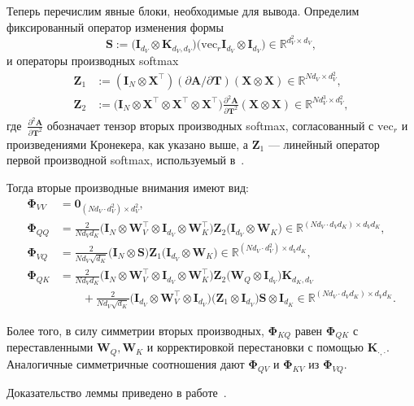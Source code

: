 \begin{lemma}
Теперь перечислим явные блоки, необходимые для вывода. Определим фиксированный оператор изменения формы
\[
    \mathbf{S} := \big(\mathbf{I}_{d_V} \otimes \mathbf{K}_{d_V, d_V}\big) \big(\mathrm{vec}_r \mathbf{I}_{d_V} \otimes \mathbf{I}_{d_V}\big)
    \in \mathbb{R}^{d_V^2 \times d_V},
\]
и операторы производных softmax
\begin{align}
    \mathbf{Z}_1 &:= (\mathbf{I}_{N} \otimes \mathbf{X}^\top)(\partial\mathbf{A}/\partial\mathbf{T})(\mathbf{X} \otimes \mathbf{X}) \in \mathbb{R}^{N d_V \times d_V^2}, \\
    \mathbf{Z}_2 &:= \big(\mathbf{I}_{N} \otimes \mathbf{X}^\top \otimes \mathbf{X}^\top \otimes \mathbf{X}^\top\big)
    \frac{\partial^2 \mathbf{A}}{\partial \mathbf{T}^2}
    (\mathbf{X} \otimes \mathbf{X})
    \in \mathbb{R}^{N d_V^3 \times d_V^2},
\end{align}
где~$\tfrac{\partial^2 \mathbf{A}}{\partial \mathbf{T}^2}$ обозначает тензор вторых производных softmax, согласованный с $\mathrm{vec}_r$ и произведениями Кронекера, как указано выше, а $\mathbf{Z}_1$ — линейный оператор первой производной softmax, используемый в~\cite{ormaniec2024attentionhessian}.

Тогда вторые производные внимания имеют вид:
\begin{align}
    \boldsymbol{\Phi}_{VV} &= \mathbf{0}_{(N d_V \cdot d_V^2) \times d_V^2}, \\
    \boldsymbol{\Phi}_{QQ} &= \frac{2}{N d_V d_K}
    \big(\mathbf{I}_{N} \otimes \mathbf{W}_V^\top \otimes \mathbf{I}_{d_V} \otimes \mathbf{W}_K^\top\big)
    \mathbf{Z}_2
    \big(\mathbf{I}_{d_V} \otimes \mathbf{W}_K\big)
    \in \mathbb{R}^{(N d_V \cdot d_V d_K) \times d_V d_K}, \\
    \boldsymbol{\Phi}_{VQ} &= \frac{2}{N d_V \sqrt{d_K}}
    \big(\mathbf{I}_{N} \otimes \mathbf{S}\big)
    \mathbf{Z}_1
    \big(\mathbf{I}_{d_V} \otimes \mathbf{W}_K\big)
    \in \mathbb{R}^{(N d_V \cdot d_V^2) \times d_V d_K}, \\
    \boldsymbol{\Phi}_{QK}
    &= \frac{2}{N d_V d_K}
    \big(\mathbf{I}_{N} \otimes \mathbf{W}_V^\top \otimes \mathbf{I}_{d_V} \otimes \mathbf{W}_K^\top\big)
    \mathbf{Z}_2
    \big(\mathbf{W}_Q \otimes \mathbf{I}_{d_V}\big) \mathbf{K}_{d_K, d_V} \\
    &\qquad + \frac{2}{N d_V \sqrt{d_K}}
    \big(\mathbf{I}_{d_V} \otimes \mathbf{W}_V^\top \otimes \mathbf{I}_{d_V}\big)
    \big(\mathbf{Z}_1 \otimes \mathbf{I}_{d_V}\big) \mathbf{S} \otimes \mathbf{I}_{d_K} \in \mathbb{R}^{(N d_V \cdot d_V d_K) \times d_V d_K}.
\end{align}

Более того, в силу симметрии вторых производных, $\boldsymbol{\Phi}_{KQ}$ равен $\boldsymbol{\Phi}_{QK}$ с переставленными $\mathbf{W}_Q,\mathbf{W}_K$ и корректировкой перестановки с помощью $\mathbf{K}_{\cdot,\cdot}$.
Аналогичные симметричные соотношения дают $\boldsymbol{\Phi}_{QV}$ и $\boldsymbol{\Phi}_{KV}$ из $\boldsymbol{\Phi}_{VQ}$.
\end{lemma}
Доказательство леммы приведено в работе~\cite{petrov2025curvaturegap}.

